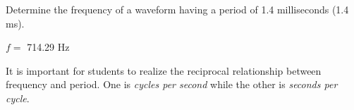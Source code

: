 

Determine the frequency of a waveform having a period of 1.4 milliseconds (1.4 ms).







$f =$ 714.29 Hz







It is important for students to realize the reciprocal relationship between frequency and period.  One is {\it cycles per second} while the other is {\it seconds per cycle}.




